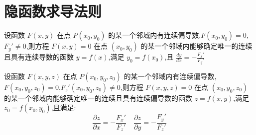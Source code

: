\section{隐函数求导法则}

\begin{theorem}[隐函数存在定理 1]\label{the: 隐函数存在定理}
	设函数 $F(x,y)$ 在点 $P(x_{0},y_{0})$ 的某一个邻域内有连续偏导数,$F(x_{0},y_{0})=0$,$F_{y}'\neq 0$,则方程 $F(x,y)=0$ 在点 $(x_{0},y_{0})$ 的某一个邻域内能够确定唯一的连续且具有连续导数的函数 $y=f(x)$,满足 $y_{0}=f(x_{0})$,且 $\frac{dy}{dx}=-\frac{F_{x}'}{F_{y}'}$
\end{theorem}
\begin{theorem}[隐函数存在定理 2]
	设函数 $F(x,y,z)$ 在点 $P(x_{0},y_{0},z_{0})$ 的某一个邻域内有连续偏导数,$F(x_{0},y_{0},z_{0})=0$,$F_{z}'(x_{0},y_{0},z_{0})\neq 0$,则方程 $F(x,y,z)=0$ 在点 $(x_{0},y_{0},z_{0})$ 的某一个邻域内能够确定唯一的连续且具有连续偏导数的函数 $z=f(x,y)$,满足 $z_{0}=f(x_{0},y_{0})$,且满足:  
	$$\frac{\partial z}{\partial x}=-\frac{F_{x}'}{F_{z}'}\quad \frac{\partial z}{\partial y}=-\frac{F_{y}'}{F_{z}'}$$
\end{theorem}
